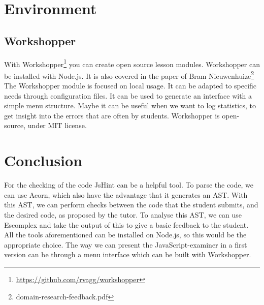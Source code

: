 \documentclass{article}
\begin{document}
\section{Environment}
\subsection{Workshopper}
With Workshopper\footnote{\url{https://github.com/rvagg/workshopper}} you can create open source lesson modules.
Workshopper can be installed with Node.js.
It is also covered in the paper of Bram Nieuwenhuize\footnote{domain-research-feedback.pdf}
The Workshopper module is focused on local usage. It can be adapted to specific needs through configuration files.
It can be used to generate an interface with a simple menu structure.
Maybe it can be useful when we want to log statistics, to get insight into the errors that are often by students.
Workshopper is open-source, under MIT license.

\section{Conclusion}
For the checking of the code JsHint can be a helpful tool.
To parse the code, we can use Acorn, which also have the advantage that it generates an AST. 
With this AST, we can perform checks between the code that the student submits, and the desired code, as proposed by the tutor.
To analyse this AST, we can use Escomplex and take the output of this to give a basic feedback to the student.
All the tools aforementioned can be installed on Node.js, so this would be the appropriate choice. 
The way we can present the JavaScript-examiner in a first version can be through a menu interface which can be built with Workshopper.
\end{document}
